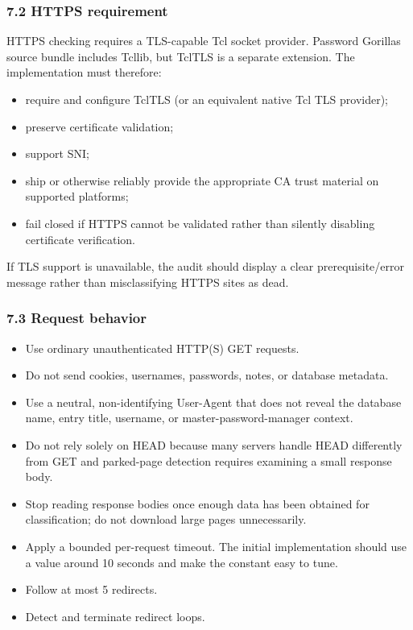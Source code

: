\documentclass[
  letterpaper,
]{article}
\providecommand{\tightlist}{%
  \setlength{\itemsep}{0pt}\setlength{\parskip}{0pt}}
\begin{document}
\subsubsection{7.2 HTTPS requirement}\label{72-https-requirement}

HTTPS checking requires a TLS-capable Tcl socket provider. Password Gorilla\textquotesingle s source bundle includes
Tcllib, but TclTLS is a separate extension. The implementation must therefore:

\begin{itemize}
\tightlist
\item
  require and configure TclTLS (or an equivalent native Tcl TLS provider);
\item
  preserve certificate validation;
\item
  support SNI;
\item
  ship or otherwise reliably provide the appropriate CA trust material on supported platforms;
\item
  fail closed if HTTPS cannot be validated rather than silently disabling certificate verification.
\end{itemize}

If TLS support is unavailable, the audit should display a clear prerequisite/error message rather than misclassifying
HTTPS sites as dead.

\subsubsection{7.3 Request behavior}\label{73-request-behavior}

\begin{itemize}
\tightlist
\item
  Use ordinary unauthenticated HTTP(S) GET requests.
\item
  Do not send cookies, usernames, passwords, notes, or database metadata.
\item
  Use a neutral, non-identifying User-Agent that does not reveal the database name, entry title, username, or
  master-password-manager context.
\item
  Do not rely solely on HEAD because many servers handle HEAD differently from GET and parked-page detection requires
  examining a small response body.
\item
  Stop reading response bodies once enough data has been obtained for classification; do not download large pages
  unnecessarily.
\item
  Apply a bounded per-request timeout. The initial implementation should use a value around 10 seconds and make the
  constant easy to tune.
\item
  Follow at most 5 redirects.
\item
  Detect and terminate redirect loops.
\end{itemize}
\end{document}
